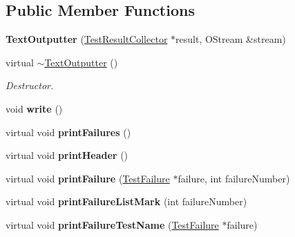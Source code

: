 \subsection*{Public Member Functions}
\begin{DoxyCompactItemize}
\item 
\hypertarget{class_text_outputter_aa513788ccc271901964847902fe3fe8e}{{\bfseries Text\-Outputter} (\hyperlink{class_test_result_collector}{Test\-Result\-Collector} $\ast$result, O\-Stream \&stream)}\label{class_text_outputter_aa513788ccc271901964847902fe3fe8e}

\item 
\hypertarget{class_text_outputter_a4198a0eaa07f3ff43fcbcab74d080b6b}{virtual \hyperlink{class_text_outputter_a4198a0eaa07f3ff43fcbcab74d080b6b}{$\sim$\-Text\-Outputter} ()}\label{class_text_outputter_a4198a0eaa07f3ff43fcbcab74d080b6b}

\begin{DoxyCompactList}\small\item\em Destructor. \end{DoxyCompactList}\item 
\hypertarget{class_text_outputter_a6b52425e9d17a04f04fc42a88b564176}{void {\bfseries write} ()}\label{class_text_outputter_a6b52425e9d17a04f04fc42a88b564176}

\item 
\hypertarget{class_text_outputter_a4c1413e4ce39317c18e3eed577dd208b}{virtual void {\bfseries print\-Failures} ()}\label{class_text_outputter_a4c1413e4ce39317c18e3eed577dd208b}

\item 
\hypertarget{class_text_outputter_a3d80efeb41c0401372536b362358dc45}{virtual void {\bfseries print\-Header} ()}\label{class_text_outputter_a3d80efeb41c0401372536b362358dc45}

\item 
\hypertarget{class_text_outputter_af2f2271d5795c6be4f7a47e255554a69}{virtual void {\bfseries print\-Failure} (\hyperlink{class_test_failure}{Test\-Failure} $\ast$failure, int failure\-Number)}\label{class_text_outputter_af2f2271d5795c6be4f7a47e255554a69}

\item 
\hypertarget{class_text_outputter_a029d1e203df4e3f426eb9685062683bc}{virtual void {\bfseries print\-Failure\-List\-Mark} (int failure\-Number)}\label{class_text_outputter_a029d1e203df4e3f426eb9685062683bc}

\item 
\hypertarget{class_text_outputter_a200849dff27b10844d117029576b17ac}{virtual void {\bfseries print\-Failure\-Test\-Name} (\hyperlink{class_test_failure}{Test\-Failure} $\ast$failure)}\label{class_text_outputter_a200849dff27b10844d117029576b17ac}


\end{DoxyCompactItemize}

